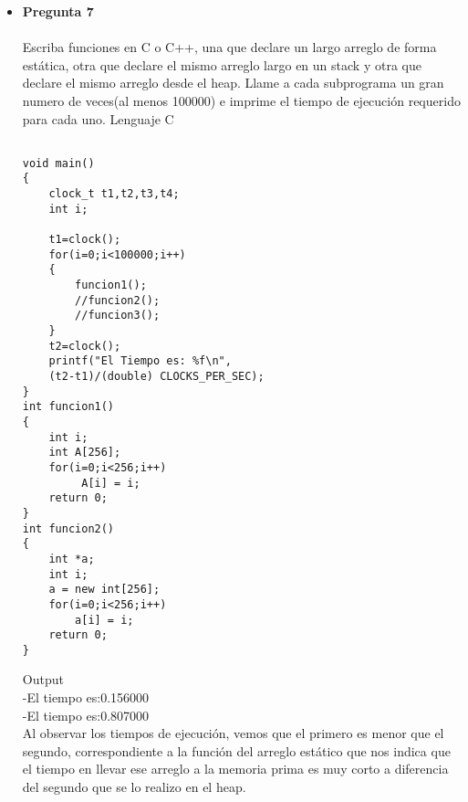 \documentclass[12pt,oneside]{article}
\begin{document}
\begin{itemize}
Lenguaje C++\\
\begin{lstlisting}[frame=single]  % Start your code-block
using System;
void main(){
	for (int i = 0; i<10; i++){
		printf("%d\n", i);

	}
		
	printf("%d\n", i); 
	//Trata de acceder a la variable i

	getch();
}
\end{lstlisting}
Fuera del FOR, printf intenta acceder a 'i' pero no puede ya que 'i' es declarada dentro for, no es una varialbe global.\\\\


Lenguaje SI SHARP\\
\begin{lstlisting}[frame=single]  % Start your code-block
using System;
namespace ConsoleApplication2
{
    
    class Program
    {
         static void Main(string[] args)
        {
            for(int i = 0; i< 10 ; i++){ 
            	Console.WriteLine(i);
      	}
 	    
            Console.WriteLine(i);
	 //Intenta acceder a la variable i
	Console.ReadLine();
	}
        }
}
\end{lstlisting}
OUTPUT\\
Error\\
El nombre i  no existe en el actual contexto\\
Fuera del FOR, Console.WriteLine(i) intenta acceder a 'i' pero no puede ya que 'i' es declarada dentro for, no es una varialbe global.\\\\


\item {\bf Pregunta 7} \\\\
Escriba funciones en C o C++, una que declare un largo arreglo de forma estática, otra que declare el mismo arreglo largo en un stack y otra que declare el mismo arreglo desde el heap. Llame a cada subprograma un gran numero de veces(al menos 100000) e imprime el tiempo de ejecución requerido para cada uno.
Lenguaje C
\begin{lstlisting}[frame=single]

void main()
{
	clock_t t1,t2,t3,t4;
	int i;

	t1=clock(); 
	for(i=0;i<100000;i++)
	{
		funcion1();
		//funcion2();
		//funcion3();
	}
	t2=clock(); 
	printf("El Tiempo es: %f\n",
	(t2-t1)/(double) CLOCKS_PER_SEC);
}
int funcion1()
{
	int i;
	int A[256];
	for(i=0;i<256;i++)
	   	 A[i] = i;
	return 0;
}
int funcion2()
{
	int *a;
	int i;
	a = new int[256];
	for(i=0;i<256;i++)
		a[i] = i;  
	return 0;
}
\end{lstlisting}
Output\\
-El tiempo es:0.156000\\
-El tiempo es:0.807000\\
Al observar los tiempos de ejecución, vemos que el primero es menor que el segundo, correspondiente a la función del arreglo estático que nos indica que el tiempo en llevar ese arreglo a la memoria prima es muy corto a diferencia del segundo que se lo realizo en el heap.


\end{itemize}
\end{document}
